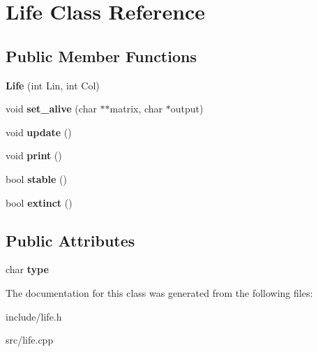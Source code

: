 \hypertarget{classLife}{}\section{Life Class Reference}
\label{classLife}
\subsection*{Public Member Functions}
\begin{DoxyCompactItemize}
\item 
{\bfseries Life} (int Lin, int Col)\hypertarget{classLife_a08477d04bc4bf98837c9e37b041f2d35}{}\label{classLife_a08477d04bc4bf98837c9e37b041f2d35}

\item 
void {\bfseries set\+\_\+alive} (char $\ast$$\ast$matrix, char $\ast$output)\hypertarget{classLife_a6ccd51752d8955b6171547fa57b14db3}{}\label{classLife_a6ccd51752d8955b6171547fa57b14db3}

\item 
void {\bfseries update} ()\hypertarget{classLife_a0e00f2735584f3ddebb397742b520d3b}{}\label{classLife_a0e00f2735584f3ddebb397742b520d3b}

\item 
void {\bfseries print} ()\hypertarget{classLife_a502bd46fefb24950e64865ce87c4b670}{}\label{classLife_a502bd46fefb24950e64865ce87c4b670}

\item 
bool {\bfseries stable} ()\hypertarget{classLife_a49c95a25d20e9eabf940305f99bcf2c3}{}\label{classLife_a49c95a25d20e9eabf940305f99bcf2c3}

\item 
bool {\bfseries extinct} ()\hypertarget{classLife_a988f58733428b7957d52ca85fecdb21d}{}\label{classLife_a988f58733428b7957d52ca85fecdb21d}

\end{DoxyCompactItemize}
\subsection*{Public Attributes}
\begin{DoxyCompactItemize}
\item 
char {\bfseries type}\hypertarget{classLife_a32121ce5b98c0b7d8b1b0f2a5f1114aa}{}\label{classLife_a32121ce5b98c0b7d8b1b0f2a5f1114aa}

\end{DoxyCompactItemize}


The documentation for this class was generated from the following files\+:\begin{DoxyCompactItemize}
\item 
include/life.\+h\item 
src/life.\+cpp\end{DoxyCompactItemize}
